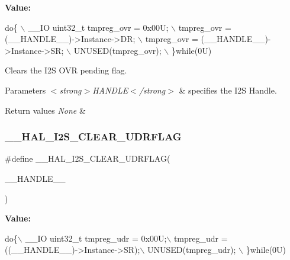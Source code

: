 {\bfseries Value\+:}
\begin{DoxyCode}
\textcolor{keywordflow}{do}\{ \(\backslash\)
                                               \_\_IO uint32\_t tmpreg\_ovr = 0x00U; \(\backslash\)
                                               tmpreg\_ovr = (\_\_HANDLE\_\_)->Instance->DR; \(\backslash\)
                                               tmpreg\_ovr = (\_\_HANDLE\_\_)->Instance->SR; \(\backslash\)
                                               UNUSED(tmpreg\_ovr); \(\backslash\)
                                              \}\textcolor{keywordflow}{while}(0U)
\end{DoxyCode}


Clears the I2S O\+VR pending flag. 


\begin{DoxyParams}{Parameters}
{\em $<$strong$>$\+H\+A\+N\+D\+L\+E$<$/strong$>$} & specifies the I2S Handle. \\
\hline
\end{DoxyParams}

\begin{DoxyRetVals}{Return values}
{\em None} & \\
\hline
\end{DoxyRetVals}
\mbox{\label{group___i2_s___exported__macros_gafc275594559c5c1e26c23f3246260937}} 
\subsubsection{\texorpdfstring{\+\_\+\+\_\+\+H\+A\+L\+\_\+\+I2\+S\+\_\+\+C\+L\+E\+A\+R\+\_\+\+U\+D\+R\+F\+L\+AG}{\_\_HAL\_I2S\_CLEAR\_UDRFLAG}}
{\footnotesize\ttfamily \#define \+\_\+\+\_\+\+H\+A\+L\+\_\+\+I2\+S\+\_\+\+C\+L\+E\+A\+R\+\_\+\+U\+D\+R\+F\+L\+AG(\begin{DoxyParamCaption}\item[{}]{\+\_\+\+\_\+\+H\+A\+N\+D\+L\+E\+\_\+\+\_\+ }\end{DoxyParamCaption})}

{\bfseries Value\+:}
\begin{DoxyCode}
\textcolor{keywordflow}{do}\{\(\backslash\)
                                               \_\_IO uint32\_t tmpreg\_udr = 0x00U;\(\backslash\)
                                               tmpreg\_udr = ((\_\_HANDLE\_\_)->Instance->SR);\(\backslash\)
                                               UNUSED(tmpreg\_udr); \(\backslash\)
                                              \}\textcolor{keywordflow}{while}(0U)
\end{DoxyCode}


